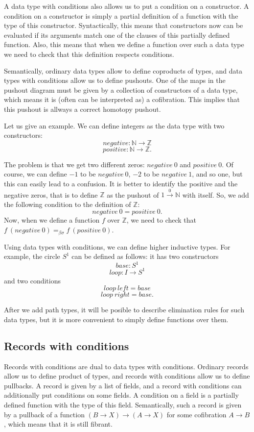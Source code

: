 \documentclass{amsart}
\theoremstyle{definition}
\theoremstyle{remark}
\newcommand{\bs}{\beta\sigma}
\newcommand{\ebs}{=_{\bs}}
\numberwithin{figure}{section}
\begin{document}
A data type with conditions also allows us to put a condition on a constructor.
A condition on a constructor is simply a partial definition of a function with the type of this constructor.
Syntactically, this means that constructors now can be evaluated if its arguments match one of the clauses of this partially defined function.
Also, this means that when we define a function over such a data type we need to check that this definition respects conditions.

Semantically, ordinary data types allow to define coproducts of types, and data types with conditions allow us to define pushouts.
One of the maps in the pushout diagram must be given by a collection of constructors of a data type, which means it is (often can be interpreted as) a cofibration.
This implies that this pushout is allways a correct homotopy pushout.

Let us give an example. We can define integers as the data type with two constructors:
\[ negative : \mathbb{N} \to \mathbb{Z} \]
\[ positive : \mathbb{N} \to \mathbb{Z}. \]

The problem is that we get two different zeros: $negative\ 0$ and $positive\ 0$.
Of course, we can define $-1$ to be $negative\ 0$, $-2$ to be $negative\ 1$, and so one, but this can easily lead to a confusion.
It is better to identify the positive and the negative zeros, that is to define $\mathbb{Z}$ as the pushout of $1 \overset{0}\to \mathbb{N}$ with itself.
So, we add the following condition to the definition of $\mathbb{Z}$:
\[ negative\ 0 = positive\ 0. \]
Now, when we define a function $f$ over $\mathbb{Z}$, we need to check that $f\ (negative\ 0) \ebs f\ (positive\ 0)$.

Using data types with conditions, we can define higher inductive types.
For example, the circle $S^1$ can be defined as follows: it has two constructors
\[ base : S^1 \]
\[ loop : I \to S^1 \]
and two conditions
\[ loop\ left = base \]
\[ loop\ right = base. \]

After we add path types, it will be posible to describe elimination rules for such data types,
but it is more convenient to simply define functions over them.

\subsection{Records with conditions}

Records with conditions are dual to data types with conditions.
Ordinary records allow us to define product of types, and records with conditions allow us to define pullbacks.
A record is given by a list of fields, and a record with conditions can additionally put conditions on some fields.
A condition on a field is a partially defined function with the type of this field.
Semantically, such a record is given by a pullback of a function $(B \to X) \to (A \to X)$ for some cofibration $A \to B$, which means that it is still fibrant.
\end{document}
